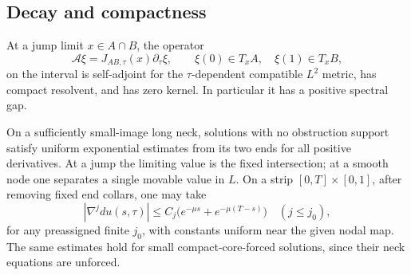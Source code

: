 \subsection{Decay and compactness}

\begin{lemma}\label{local:decay}
At a jump limit $x\in A\cap B$, the operator
\[
 \mathcal A\xi=J_{AB,\tau}(x)\partial_\tau\xi,\qquad
 \xi(0)\in T_xA,\quad\xi(1)\in T_xB,
\]
on the interval is self-adjoint for the $\tau$-dependent compatible
$L^2$ metric, has compact resolvent, and has zero kernel.  In particular
it has a positive spectral gap.

On a sufficiently small-image long neck, solutions with no obstruction
support satisfy uniform exponential estimates from its two ends for
all positive derivatives.  At a jump the limiting value is the fixed
intersection; at a smooth node one separates a single movable value in
$L$.  On a strip $[0,T]\times[0,1]$, after removing fixed end collars,
one may take
\begin{equation}\label{local:two-sided-decay}
 |\nabla^jdu(s,\tau)|\leq C_j\bigl(e^{-\mu s}+e^{-\mu(T-s)}\bigr)
 \quad (j\leq j_0),
\end{equation}
for any preassigned finite $j_0$, with constants uniform near the given
nodal map.  The same estimates hold for small compact-core-forced
solutions, since their neck equations are unforced.
\end{lemma}
